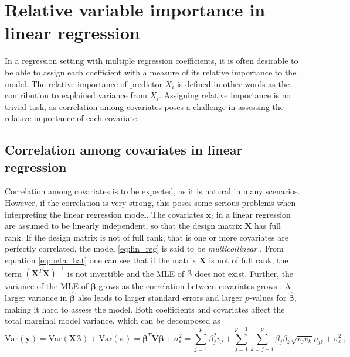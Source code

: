 \section{Relative variable importance in linear regression} 
In a regression setting with multiple regression coefficients, it is often desirable to be able to assign each coefficient with a measure of its relative importance to the model.
The relative importance of predictor $X_i$ is defined in other words as the contribution to explained variance from $X_i$.
Assigning relative importance is no trivial task, as correlation among covariates poses a challenge in assessing the relative importance of each covariate.
\newline
\newline
\subsection{Correlation among covariates in linear regression}
Correlation among covariates is to be expected, as it is natural in many scenarios. However, if the correlation is very strong, this poses some serious problems when interpreting the linear regression model.
The covariates $\mathbf{x}_i$ in a linear regression are assumed to be linearly independent, so that the design matrix $\mathbf{X}$ has full rank.
If the design matrix is not of full rank, that is one or more covariates are perfectly correlated, the model \eqref{eq:lin_reg} is said to be \textit{multicollinear} \citep{Poole_OFarrell_1971}. 
From equation \eqref{eq:beta_hat} one can see that if the matrix $\mathbf{X}$ is not of full rank, the term $(\mathbf{X}^T\mathbf{X})^{-1}$ is not invertible and the MLE of $\boldsymbol{\beta}$ does not exist. 
Further, the variance of the MLE of $\boldsymbol{\beta}$ grows as the correlation between covariates grows \citep[p. 116]{GLMM_book}. A larger variance in $\boldsymbol{\hat{\beta}}$ also leads to larger standard errors and larger $p$-values for $\boldsymbol{\hat{\beta}}$, making it hard to assess the model.
Both coefficients and covariates affect the total marginal model variance, which can be decomposed as
\begin{equation}
    \label{eq:var_y_full}
    \text{Var}(\mathbf{y}) = \text{Var}(\mathbf{X}\boldsymbol{\beta}) + \text{Var}(\boldsymbol{\varepsilon}) = \boldsymbol{\beta}^T\mathbf{V}\boldsymbol{\beta} + \sigma^2_{\varepsilon} = \sum_{j=1}^p\beta_j^2v_j +\sum_{j=1}^{p-1}\sum_{k=j+1}^{p} \beta_j\beta_k\sqrt{v_jv_k}\rho_{jk} + \sigma_{\varepsilon}^2 \ ,
\end{equation}
